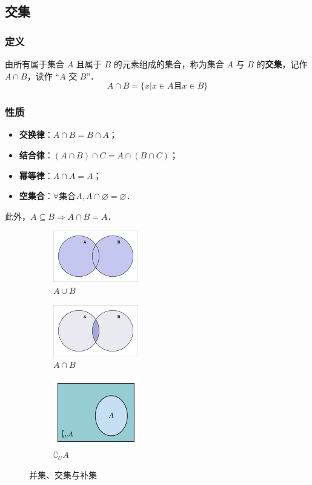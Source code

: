 \documentclass[a4paper,openany]{ctexbook}
\begin{document}
\subsection{交集}

\subsubsection{定义}

由所有属于集合 \(A\) 且属于 \(B\) 的元素组成的集合，称为集合 \(A\) 与 \(B\) 的\textbf{交集}，记作 \(A\cap B\)，读作 “\(A\) 交 \(B\)”．
\[
    A \cap B=\{x|x\in A \text{且} x\in B\}
\]

\subsubsection{性质}

\begin{itemize}
    \item \textbf{交换律}：\(A\cap B=B\cap A\)；
    \item \textbf{结合律}：\((A\cap B)\cap C=A\cap(B\cap C)\)；
    \item \textbf{幂等律}：\(A\cap A=A\)；
    \item \textbf{空集合}：\(\forall\text{集合}A, A\cap\varnothing=\varnothing\)．
\end{itemize}

此外，\(A\subseteq B \Rightarrow A\cap B=A\)．

\begin{figure}
    \centering
    \begin{subfigure}{10em}
        \includegraphics[width=10em]{image1.png}
        \caption{\(A\cup B\)}
    \end{subfigure}
    \quad
    \begin{subfigure}{10em}
        \includegraphics[width=10em]{image3.png}
        \caption{\(A\cap B\)}
    \end{subfigure}
    \quad
    \begin{subfigure}{10em}
        \includegraphics[width=10em]{image2.png}
        \caption{\(\complement_U A\)}
    \end{subfigure}
    \caption{并集、交集与补集}
\end{figure}
\end{document}
